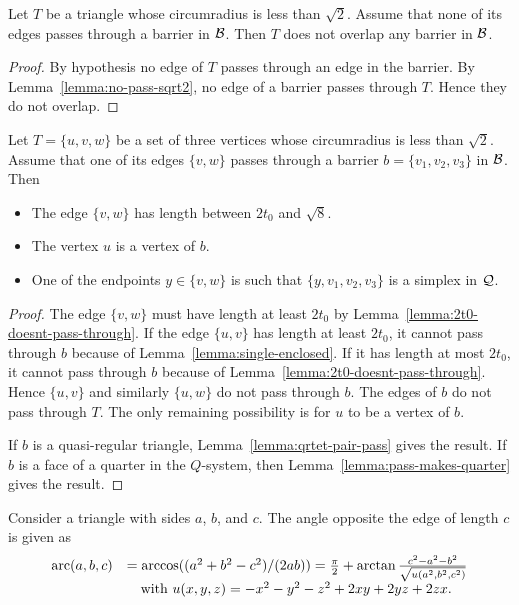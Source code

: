 \begin{lemma} \label{lemma:no-eta-barrier}
Let $T$ be a triangle whose circumradius is less than $\sqrt2$.
Assume that none of its edges passes through a barrier in ${\mathcal B}$.
Then $T$ does not overlap any barrier in ${\mathcal B}$.
\end{lemma}

\begin{proof}  By hypothesis no edge of $T$ passes through an edge in
the barrier.  By Lemma~\ref{lemma:no-pass-sqrt2}, no edge of a
barrier passes through $T$. Hence they do not overlap.
\end{proof}

\begin{lemma} \label{lemma:eta-barrier}
Let $T=\{u,v,w\}$ be a set of three vertices whose circumradius is
less than $\sqrt2$.  Assume that one of its edges $\{v,w\}$ passes
through a barrier $b=\{v_1,v_2,v_3\}$ in ${\mathcal B}$.  Then
    \begin{itemize}
        \item The edge $\{v,w\}$ has length between $2t_0$ and $\sqrt8$.
        \item The vertex $u$ is a vertex of $b$.
        \item One of the endpoints $y\in\{v,w\}$ is such that
            $\{y,v_1,v_2,v_3\}$ is a simplex in ${\mathcal Q}$.
    \end{itemize}
\end{lemma}

\begin{proof}
    The edge $\{v,w\}$ must have length at least $2t_0$ by
Lemma~\ref{lemma:2t0-doesnt-pass-through}. If the edge $\{u,v\}$
has length at least $2t_0$, it cannot pass through $b$ because of
Lemma~\ref{lemma:single-enclosed}.  If it has length at most
$2t_0$, it cannot pass through $b$ because of
Lemma~\ref{lemma:2t0-doesnt-pass-through}. Hence $\{u,v\}$ and
similarly $\{u,w\}$ do not pass through $b$.  The edges of $b$ do
not pass through $T$.  The only remaining possibility is for $u$
to be a vertex of $b$.

If $b$ is a quasi-regular triangle,
Lemma~\ref{lemma:qrtet-pair-pass} gives the result. If $b$ is a
face of a quarter in the $Q$-system, then
Lemma~\ref{lemma:pass-makes-quarter} gives the result.
\end{proof}

\begin{definition} 
  Consider a triangle with sides
$a$, $b$, and $c$.  The angle opposite the edge of length $c$ is
given as
    $$
    \begin{array}{lll}
    \operatorname{arc}(a,b,c)&=\arccos((a^2+b^2-c^2)/(2a b))= \frac{\pi}2 +
      \arctan{\frac {c^2-a^2-b^2}{\sqrt{u(a^2,b^2,c^2)}}}\\
      &\quad\text{with } u(x,y,z) = -x^2-y^2-z^2+2 x y + 2 y z + 2
      z x.
    \end{array}
    $$
\end{definition}

